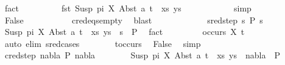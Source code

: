 \begin{isabellebody}
\ fact\isanewline
\ \ \ \ \ \ \isamarkupfalse%
\ \isamarkupfalse%
\ {\isachardoublequoteopen}fst\ {\isacharparenleft}{\kern0pt}{\isacharparenleft}{\kern0pt}Susp\ pi\ X{\isacharcomma}{\kern0pt}\ Abst\ a\ t{\isacharparenright}{\kern0pt}\ {\isacharhash}{\kern0pt}\ xs{\isacharcomma}{\kern0pt}\ ys{\isacharparenright}{\kern0pt}\ {\isasymnoteq}\ {\isacharbrackleft}{\kern0pt}{\isacharbrackright}{\kern0pt}{\isachardoublequoteclose}\isanewline
\ \ \ \ \ \ \ \ \isamarkupfalse%
\ simp\isanewline
\ \ \ \ \ \ \isamarkupfalse%
\ \isamarkupfalse%
\ False\ \isanewline
\ \ \ \ \ \ \ \ \isamarkupfalse%
\ c{\isacharunderscore}{\kern0pt}red{\isacharunderscore}{\kern0pt}eqs{\isacharunderscore}{\kern0pt}empty\ \isamarkupfalse%
\ blast\isanewline
\ \ \ \ \isamarkupfalse%
\isanewline
\ \ \ \ \ \ \isamarkupfalse%
\ {\isacharparenleft}{\kern0pt}sred{\isacharunderscore}{\kern0pt}step\ s{}\ P{}\ s{}{\isacharparenright}{\kern0pt}\isanewline
\ \ \ \ \ \ \isamarkupfalse%
\ {\isachardoublequoteopen}{\isacharparenleft}{\kern0pt}{\isacharparenleft}{\kern0pt}Susp\ pi\ X{\isacharcomma}{\kern0pt}\ Abst\ a\ t{\isacharparenright}{\kern0pt}\ {\isacharhash}{\kern0pt}\ xs{\isacharcomma}{\kern0pt}\ ys{\isacharparenright}{\kern0pt}\ {\isasymturnstile}\ s{}\ {\isasymleadsto}\ P{}{\isachardoublequoteclose}\ \isamarkupfalse%
\ fact\isanewline
\ \ \ \ \ \ \isamarkupfalse%
\ {\isachardoublequoteopen}{\isasymnot}\ occurs\ X\ t{\isachardoublequoteclose}\ \isanewline
\ \ \ \ \ \ \ \ \isamarkupfalse%
\ {\isacharparenleft}{\kern0pt}auto\ elim{\isacharcolon}{\kern0pt}\ s{\isacharunderscore}{\kern0pt}red{\isachardot}{\kern0pt}cases{\isacharparenright}{\kern0pt}\isanewline
\ \ \ \ \ \ \isamarkupfalse%
\ t{\isacharunderscore}{\kern0pt}occurs\ \isamarkupfalse%
\ False\ \isamarkupfalse%
\ simp\isanewline
\ \ \ \ \isamarkupfalse%
\isanewline
\ \ \ \ \ \ \isamarkupfalse%
\ {\isacharparenleft}{\kern0pt}cred{\isacharunderscore}{\kern0pt}step\ nabla{}\ P{}\ nabla{}{\isacharparenright}{\kern0pt}\isanewline
\ \ \ \ \ \ \isamarkupfalse%
\ {\isachardoublequoteopen}{\isacharparenleft}{\kern0pt}{\isacharparenleft}{\kern0pt}Susp\ pi\ X{\isacharcomma}{\kern0pt}\ Abst\ a\ t{\isacharparenright}{\kern0pt}\ {\isacharhash}{\kern0pt}\ xs{\isacharcomma}{\kern0pt}\ ys{\isacharparenright}{\kern0pt}\ {\isasymturnstile}\ nabla{}\ {\isasymrightarrow}\ P{}{\isachardoublequoteclose}\ \isamarkupfalse%

\end{isabellebody}
